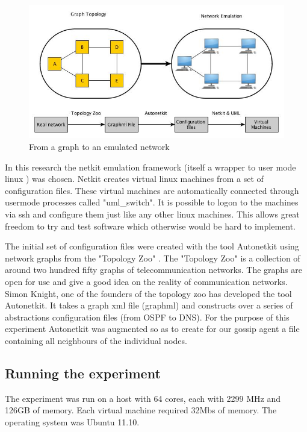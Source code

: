 \begin{figure}[h!]
    \begin{center}
        \includegraphics[scale=0.6]{graph_to_emulation}
    \end{center}
    \caption{From a graph to an emulated network}
    \label{fig:graph_to_emulation}
\end{figure}

In this research the netkit emulation framework (itself a wrapper to user mode linux \cite{uml}) was chosen. Netkit \cite{netkit} creates virtual linux machines from a set of configuration files. These virtual machines are automatically connected through usermode processes called "uml\_switch". It is possible to logon to the machines via ssh and configure them just like any other linux machines. This allows great freedom to try and test software which otherwise would be hard to implement.

The initial set of configuration files were created with the tool Autonetkit \cite{autonetkit} using network graphs from the "Topology Zoo" \cite{knight_internet_2011}. The "Topology Zoo" is a collection of around two hundred fifty graphs of telecommunication networks. The graphs are open for use and give a good idea on the reality of communication networks. Simon Knight, one of the founders of the topology zoo has developed the tool Autonetkit. It takes a graph xml file (graphml) and constructs over a series of abstractions configuration files (from OSPF to DNS). For the purpose of this experiment Autonetkit was augmented so as to create for our gossip agent a file containing all neighbours of the individual nodes.

\subsection{Running the experiment}
The experiment was run on a host with 64 cores, each with 2299 MHz and 126GB of memory. Each virtual machine required 32Mbs of memory. The operating system was Ubuntu 11.10.
